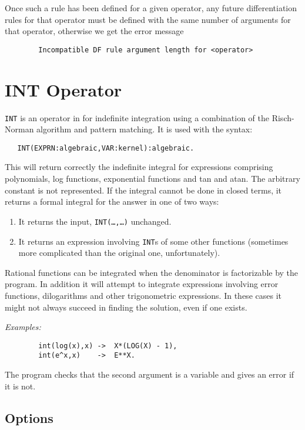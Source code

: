 Once such a rule has been defined for a given operator, any future
differentiation rules for that operator must be
defined with the same number of arguments for that operator, otherwise we
get the error message
\begin{verbatim}
        Incompatible DF rule argument length for <operator>
\end{verbatim}

\section{INT Operator}
{\tt INT} is an operator in {\REDUCE} for indefinite
integration using a
combination of the Risch-Norman algorithm and pattern matching.  It is
used with the syntax:
\begin{verbatim}
   INT(EXPRN:algebraic,VAR:kernel):algebraic.
\end{verbatim}
This will return correctly the indefinite integral for expressions comprising
polynomials, log functions, exponential functions and tan and atan. The
arbitrary constant is not represented. If the integral cannot be done in
closed terms, it returns a formal integral for the answer in one of two ways:
\begin{enumerate}
\item It returns the input, {\tt INT(\ldots,\ldots)} unchanged.

\item It returns an expression involving {\tt INT}s of some
      other functions (sometimes more complicated than
      the original one, unfortunately).
\end{enumerate}
Rational functions can be integrated when the denominator is factorizable
by the program. In addition it will attempt to integrate expressions
involving error functions, dilogarithms and other trigonometric
expressions. In these cases it might not always succeed in finding the
solution, even if one exists.

{\it Examples:}
\begin{verbatim}
        int(log(x),x) ->  X*(LOG(X) - 1),
        int(e^x,x)    ->  E**X.
\end{verbatim}
The program checks that the second argument is a variable and gives an
error if it is not.


\subsection{Options}

